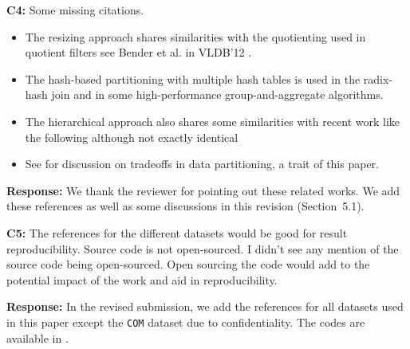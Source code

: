 \begin{shaded}
	\noindent\textbf{C4:} Some missing citations.
	\begin{itemize}[noitemsep]
		\item The resizing approach shares similarities with the quotienting used in quotient filters see Bender et al. in VLDB'12 \cite{bender2012don}.  
		\item The hash-based partitioning with multiple hash tables is used in the radix-hash join \cite{boncz1999database} and in some high-performance group-and-aggregate algorithms.  
		\item The hierarchical approach also shares some similarities with recent work like the following although not exactly identical \cite{zuo2018write}
		\item See \cite{zhang2019data} for discussion on tradeoffs in data partitioning, a trait of this paper.
	\end{itemize} 	
\end{shaded}
%
\noindent\textbf{Response:} 
We thank the reviewer for pointing out these related works. We add these references as well as some discussions in this revision (Section~5.1). 

\begin{shaded}
	\noindent\textbf{C5:} 
	The references for the different datasets would be good for result reproducibility.
	Source code is not open-sourced.  I didn't see any mention of the source code being open-sourced.  Open sourcing the code would add to the potential impact of the work and aid in reproducibility.
\end{shaded}
%
\noindent\textbf{Response:} 
In the revised submission, we add the references for all datasets used in this paper except the {\tt COM} dataset due to confidentiality. The codes are available in .
